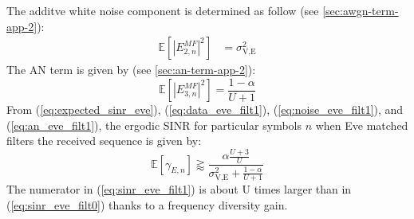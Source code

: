 \documentclass[journal,comsoc]{IEEEtran}
\newcommand{\EX}[1]{\mathbb{E} \left[#1\right]}%
\begin{document}
The additve white noise component is determined as follow (see \ref{sec:awgn-term-app-2}):
\begin{equation}
	\begin{split}
	\EX{|E_{2,n}^{MF}|^2} &= \sigma^2_{\text{V,E}}
	\end{split}
	\label{eq:noise_eve_filt1}
\end{equation}
The AN term is given by (see \ref{sec:an-term-app-2}):
\begin{equation}
	\EX{|E_{3,n}^{MF}|^2} = \frac{1-\alpha}{U+1}
	\label{eq:an_eve_filt1}
\end{equation}
From (\ref{eq:expected_sinr_eve}), (\ref{eq:data_eve_filt1}), (\ref{eq:noise_eve_filt1}), and (\ref{eq:an_eve_filt1}),  the ergodic SINR for particular symbols $n$ when Eve matched filters the received sequence is given by:
\begin{equation}
\EX{\gamma_{E,n}} \gtrapprox \frac{\alpha \frac{U+3}{U}}{\sigma^2_{\text{V,E}} + \frac{1-\alpha}{U+1}}
\label{eq:sinr_eve_filt1}
\end{equation}
The numerator in (\ref{eq:sinr_eve_filt1}) is about U times larger than in (\ref{eq:sinr_eve_filt0}) thanks to a frequency diversity gain.
\end{document}
